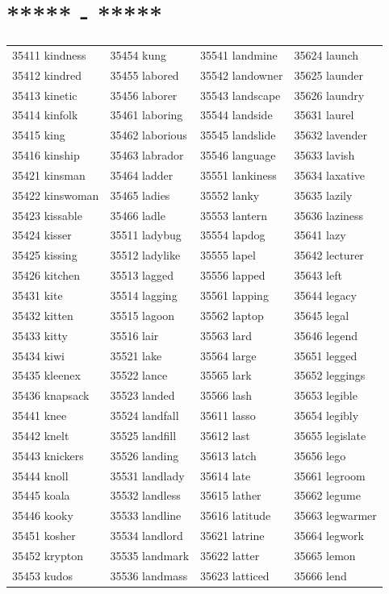 \documentclass[10pt, oneside]{book}
\begin{document}
\begin{table}[h]
	\centering
	\section*{***** - *****}
	\begin{tabular}{l l l l}
35411 kindness &35454 kung &35541 landmine &35624 launch\\
35412 kindred &35455 labored &35542 landowner &35625 launder\\
35413 kinetic &35456 laborer &35543 landscape &35626 laundry\\
35414 kinfolk &35461 laboring &35544 landside &35631 laurel\\
35415 king &35462 laborious &35545 landslide &35632 lavender\\
35416 kinship &35463 labrador &35546 language &35633 lavish\\
35421 kinsman &35464 ladder &35551 lankiness &35634 laxative\\
35422 kinswoman &35465 ladies &35552 lanky &35635 lazily\\
35423 kissable &35466 ladle &35553 lantern &35636 laziness\\
35424 kisser &35511 ladybug &35554 lapdog &35641 lazy\\
35425 kissing &35512 ladylike &35555 lapel &35642 lecturer\\
35426 kitchen &35513 lagged &35556 lapped &35643 left\\
35431 kite &35514 lagging &35561 lapping &35644 legacy\\
35432 kitten &35515 lagoon &35562 laptop &35645 legal\\
35433 kitty &35516 lair &35563 lard &35646 legend\\
35434 kiwi &35521 lake &35564 large &35651 legged\\
35435 kleenex &35522 lance &35565 lark &35652 leggings\\
35436 knapsack &35523 landed &35566 lash &35653 legible\\
35441 knee &35524 landfall &35611 lasso &35654 legibly\\
35442 knelt &35525 landfill &35612 last &35655 legislate\\
35443 knickers &35526 landing &35613 latch &35656 lego\\
35444 knoll &35531 landlady &35614 late &35661 legroom\\
35445 koala &35532 landless &35615 lather &35662 legume\\
35446 kooky &35533 landline &35616 latitude &35663 legwarmer\\
35451 kosher &35534 landlord &35621 latrine &35664 legwork\\
35452 krypton &35535 landmark &35622 latter &35665 lemon\\
35453 kudos &35536 landmass &35623 latticed &35666 lend\\
	\end{tabular}
 \end{table}
\end{document}
